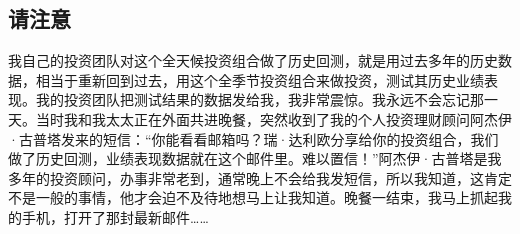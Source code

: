 \subsection{请注意}

我自己的投资团队对这个全天候投资组合做了历史回测，就是用过去多年的历史数据，相当于重新回到过去，用这个全季节投资组合来做投资，测试其历史业绩表现。我的投资团队把测试结果的数据发给我，我非常震惊。我永远不会忘记那一天。当时我和我太太正在外面共进晚餐，突然收到了我的个人投资理财顾问阿杰伊·古普塔发来的短信：“你能看看邮箱吗？瑞·达利欧分享给你的投资组合，我们做了历史回测，业绩表现数据就在这个邮件里。难以置信！”阿杰伊·古普塔是我多年的投资顾问，办事非常老到，通常晚上不会给我发短信，所以我知道，这肯定不是一般的事情，他才会迫不及待地想马上让我知道。晚餐一结束，我马上抓起我的手机，打开了那封最新邮件……
